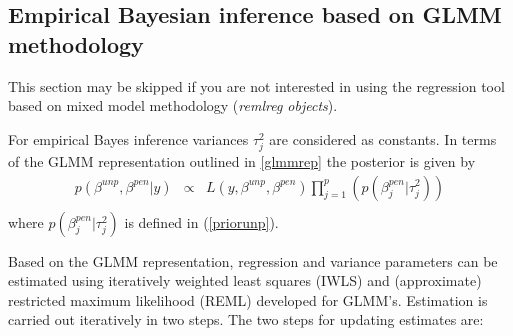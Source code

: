 \documentclass[11pt,a4paper,twoside]{bayesxarticle}
\begin{document}
\subsection{Empirical Bayesian inference based on GLMM methodology}
\label{glmmmeth}

This section may be skipped if you are not interested in using the
regression tool based on mixed model methodology ({\em remlreg
objects}).


For empirical Bayes inference variances $\tau^2_j$ are considered
as constants. In terms of the GLMM representation outlined in
\autoref{glmmrep} the posterior is given by
\begin{equation}
\label{posterior2}
\begin{array}{lll}
 p(\beta^{unp},\beta^{pen}|y) & \propto & L(y,\beta^{unp},\beta^{pen})
\displaystyle \prod_{j=1}^p \left( p(\beta_j^{pen}|\tau_j^2)  \right) \\
 \end{array}
\end{equation}
where $p(\beta_j^{pen}|\tau_j^2)$ is defined in (\ref{priorunp}).

Based on the GLMM representation, regression and variance
parameters can be estimated using iteratively weighted least
squares (IWLS) and (approximate) restricted maximum likelihood
(REML) developed for GLMM's. Estimation is carried out iteratively
in two steps. The two steps for updating estimates are:
\end{document}
